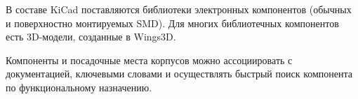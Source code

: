 
В составе KiCad поставляются библиотеки электронных компонентов 
(обычных и поверхностно монтируемых SMD). Для многих библиотечных 
компонентов есть 3D-модели, созданные в Wings3D.

Компоненты и посадочные места корпусов можно ассоциировать с документацией, 
ключевыми словами и осуществлять быстрый поиск компонента по 
функциональному назначению.

